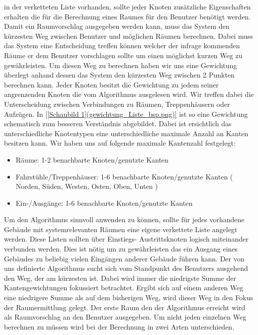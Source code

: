 in der verketteten Liste vorhanden, sollte jeder Knoten zusätzliche
Eigenschaften erhalten die für die Berechnung eines Raumes für den Benutzer
benötigt werden.
Damit ein Raumvorschlag ausgegeben werden kann, muss das System den kürzesten
Weg zwischen Benutzer und möglichen Räumen berechnen. Dabei muss das System
eine Entscheidung treffen können welcher der infrage kommenden Räume er dem
Benutzer vorschlagen sollte um einen möglichst kurzen Weg zu gewährleisten.
Um diesen Weg zu berechnen haben wir uns eine Gewichtung überlegt anhand dessen
das System den kürzesten Weg zwischen 2 Punkten berechnen kann. Jeder Knoten
besitzt die Gewichtung zu jedem seiner angrenzenden Knoten die vom Algorithmus
ausgelesen wird. Wir treffen dabei die Unterscheidung zwischen Verbindungen zu
Räumen, Treppenhäusern oder Aufzügen.
In \ref{[Schaubild 1](gewichtung_Liste_bsp.png)} ist so eine Gewichtung
schematisch zum besseren Verständnis abgebildet. Dabei ist ersichtlich das
unterschiedliche Knotentypen eine unterschiedliche maximale Anzahl an Kanten
besitzen kann. Wir haben uns auf folgende maximale Kantenzahl festgelegt:

\begin{itemize}
	\item Räume: 1-2 benachbarte Knoten/genutzte Kanten
	\item Fahrstühle/Treppenhäuser: 1-6 benachbarte Knoten/genutzte Kanten ( Norden, Süden, Westen, Osten, Oben, Unten )
	\item Ein-/Ausgänge: 1-6 benachbarte Knoten/genutzte Kanten
\end{itemize}

Um den Algorithmus sinnvoll anwenden zu können, sollte für jedes vorhandene
Gebäude mit systemrelevanten Räumen eine eigene verkettete Liste angelegt
werden. Diese Listen sollten über Einstiegs- \bzw Austrittsknoten logisch
miteinander verbunden werden. Dies ist nötig um zu gewährleisten das ein
Ausgang eines Gebäudes zu beliebig vielen Eingängen anderer Gebäude führen
kann.
Der von uns definierte Algorithmus sucht sich vom Standpunkt des Benutzers
ausgehend den Weg, der am kürzesten ist. Dabei wird immer die niedrigste Summe
der Kantengewichtungen fokussiert betrachtet. Ergibt sich auf einem anderen Weg
eine niedrigere Summe als auf dem bisherigen Weg, wird dieser Weg in den Fokus
der Raumermittlung gelegt. Der erste Raum den der Algorithmus erreicht wird als
Raumvorschlag an den Benutzer ausgegeben. 
Um nicht jeden einzelnen Weg berechnen zu müssen wird bei der Berechnung in
zwei Arten unterschieden.

